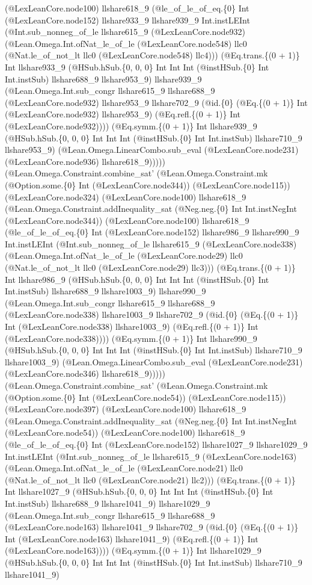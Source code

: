 \documentclass[11pt]{article}
\begin{document}
(@LexLeanCore.node100) llshare618\_9 (@le\_of\_le\_of\_eq.\{0\} Int (@LexLeanCore.node152) llshare933\_9 llshare939\_9 Int.instLEInt (@Int.sub\_nonneg\_of\_le llshare615\_9 (@LexLeanCore.node932) (@Lean.Omega.Int.ofNat\_le\_of\_le (@LexLeanCore.node548) llc0 (@Nat.le\_of\_not\_lt llc0 (@LexLeanCore.node548) llc4))) (@Eq.trans.\{(0 + 1)\} Int llshare933\_9 (@HSub.hSub.\{0, 0, 0\} Int Int Int (@instHSub.\{0\} Int Int.instSub) llshare688\_9 llshare953\_9) llshare939\_9 (@Lean.Omega.Int.sub\_congr llshare615\_9 llshare688\_9 (@LexLeanCore.node932) llshare953\_9 llshare702\_9 (@id.\{0\} (@Eq.\{(0 + 1)\} Int (@LexLeanCore.node932) llshare953\_9) (@Eq.refl.\{(0 + 1)\} Int (@LexLeanCore.node932)))) (@Eq.symm.\{(0 + 1)\} Int llshare939\_9 (@HSub.hSub.\{0, 0, 0\} Int Int Int (@instHSub.\{0\} Int Int.instSub) llshare710\_9 llshare953\_9) (@Lean.Omega.LinearCombo.sub\_eval (@LexLeanCore.node231) (@LexLeanCore.node936) llshare618\_9))))) (@Lean.Omega.Constraint.combine\_sat' (@Lean.Omega.Constraint.mk (@Option.some.\{0\} Int (@LexLeanCore.node344)) (@LexLeanCore.node115)) (@LexLeanCore.node324) (@LexLeanCore.node100) llshare618\_9 (@Lean.Omega.Constraint.addInequality\_sat (@Neg.neg.\{0\} Int Int.instNegInt (@LexLeanCore.node344)) (@LexLeanCore.node100) llshare618\_9 (@le\_of\_le\_of\_eq.\{0\} Int (@LexLeanCore.node152) llshare986\_9 llshare990\_9 Int.instLEInt (@Int.sub\_nonneg\_of\_le llshare615\_9 (@LexLeanCore.node338) (@Lean.Omega.Int.ofNat\_le\_of\_le (@LexLeanCore.node29) llc0 (@Nat.le\_of\_not\_lt llc0 (@LexLeanCore.node29) llc3))) (@Eq.trans.\{(0 + 1)\} Int llshare986\_9 (@HSub.hSub.\{0, 0, 0\} Int Int Int (@instHSub.\{0\} Int Int.instSub) llshare688\_9 llshare1003\_9) llshare990\_9 (@Lean.Omega.Int.sub\_congr llshare615\_9 llshare688\_9 (@LexLeanCore.node338) llshare1003\_9 llshare702\_9 (@id.\{0\} (@Eq.\{(0 + 1)\} Int (@LexLeanCore.node338) llshare1003\_9) (@Eq.refl.\{(0 + 1)\} Int (@LexLeanCore.node338)))) (@Eq.symm.\{(0 + 1)\} Int llshare990\_9 (@HSub.hSub.\{0, 0, 0\} Int Int Int (@instHSub.\{0\} Int Int.instSub) llshare710\_9 llshare1003\_9) (@Lean.Omega.LinearCombo.sub\_eval (@LexLeanCore.node231) (@LexLeanCore.node346) llshare618\_9))))) (@Lean.Omega.Constraint.combine\_sat' (@Lean.Omega.Constraint.mk (@Option.some.\{0\} Int (@LexLeanCore.node54)) (@LexLeanCore.node115)) (@LexLeanCore.node397) (@LexLeanCore.node100) llshare618\_9 (@Lean.Omega.Constraint.addInequality\_sat (@Neg.neg.\{0\} Int Int.instNegInt (@LexLeanCore.node54)) (@LexLeanCore.node100) llshare618\_9 (@le\_of\_le\_of\_eq.\{0\} Int (@LexLeanCore.node152) llshare1027\_9 llshare1029\_9 Int.instLEInt (@Int.sub\_nonneg\_of\_le llshare615\_9 (@LexLeanCore.node163) (@Lean.Omega.Int.ofNat\_le\_of\_le (@LexLeanCore.node21) llc0 (@Nat.le\_of\_not\_lt llc0 (@LexLeanCore.node21) llc2))) (@Eq.trans.\{(0 + 1)\} Int llshare1027\_9 (@HSub.hSub.\{0, 0, 0\} Int Int Int (@instHSub.\{0\} Int Int.instSub) llshare688\_9 llshare1041\_9) llshare1029\_9 (@Lean.Omega.Int.sub\_congr llshare615\_9 llshare688\_9 (@LexLeanCore.node163) llshare1041\_9 llshare702\_9 (@id.\{0\} (@Eq.\{(0 + 1)\} Int (@LexLeanCore.node163) llshare1041\_9) (@Eq.refl.\{(0 + 1)\} Int (@LexLeanCore.node163)))) (@Eq.symm.\{(0 + 1)\} Int llshare1029\_9 (@HSub.hSub.\{0, 0, 0\} Int Int Int (@instHSub.\{0\} Int Int.instSub) llshare710\_9 llshare1041\_9) 
\end{document}
